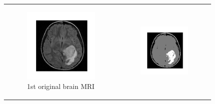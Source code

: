 \documentclass[a4paper]{article}
\begin{document}
\begin{figure}[h!]%
    \centering
    {\renewcommand{\arraystretch}{0}
    \begin{tabular}{c@{}c}
    \begin{subfigure}[b]{.35\columnwidth}
        \centering
        \includegraphics[width=\columnwidth]{../Cluster_results/MRI_multi/1st.png}%
        \caption{{\small 1st original brain MRI}}
    \end{subfigure}&
    \begin{subfigure}[b]{.35\columnwidth}  
        \centering
        \includegraphics[width=\columnwidth]{../Cluster_results/MRI_multi/1st_seg.png}%

\end{subfigure}
\end{tabular}}
\end{figure}
\end{document}
